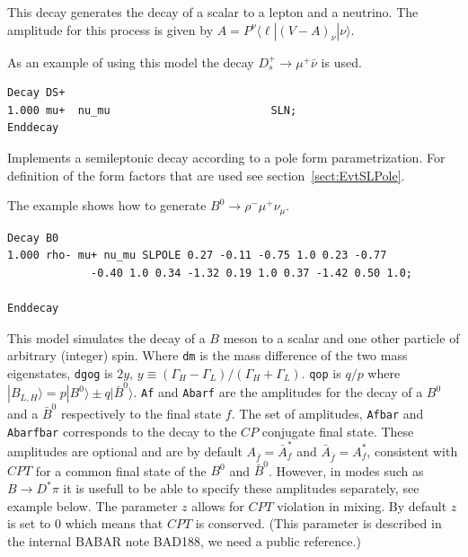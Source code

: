 
\label{sln}



\Expl
This decay generates the decay of a scalar to a lepton and a 
neutrino. The amplitude for this process is given by
$A=P^{\nu}\langle \ell | (V-A)_{\nu} | \nu \rangle$.

\Example 
As an example of using this model the decay $D_s^+\rightarrow \mu^+\bar\nu$
is used.
\begin{verbatim}
Decay DS+
1.000 mu+  nu_mu                         SLN;
Enddecay
\end{verbatim}




\label{SLPOLE}



\Expl
Implements a semileptonic decay according to a pole form parametrization.
For definition of the form factors that are used see 
section~\ref{sect:EvtSLPole}.
 
\Example
The example shows how to generate $B^0\rightarrow \rho^- \mu^+ \nu_{\mu}$.
\begin{verbatim}
Decay B0
1.000 rho- mu+ nu_mu SLPOLE 0.27 -0.11 -0.75 1.0 0.23 -0.77 
             -0.40 1.0 0.34 -1.32 0.19 1.0 0.37 -1.42 0.50 1.0;

Enddecay
\end{verbatim}







\label{ssdcp}



\Expl
This model simulates the decay of a $B$ meson to a scalar and
one other particle of arbitrary (integer) spin.
Where {\tt dm} is the mass difference of the two mass eigenstates, {\tt dgog} 
is $2y$, $y\equiv (\Gamma_H-\Gamma_L)/(\Gamma_H+\Gamma_L)$. {\tt qop} is
$q/p$ where $|B_{L,H}\rangle=p|B^0\rangle\pm q|\bar B^0\rangle$.
{\tt Af} and {\tt Abarf} are the amplitudes for the decay of a $B^0$ and a 
$\bar B^0$ respectively to the final state $f$. The set of amplitudes,
{\tt Afbar} and {\tt Abarfbar} corresponds to the decay to the 
$CP$ conjugate final state. These amplitudes are optional and are by
default $A_{\bar f}=\bar A^*_{f}$ and ${\bar A}_{\bar f}=A^*_f$,
consistent with $CPT$ for a common final state of the $B^0$ and $\bar B^0$.
However, in modes such as $B\to D^*\pi$ it is usefull to be able to 
specify these amplitudes separately, see example below. The parameter
$z$ allows for $CPT$ violation in mixing. By default $z$ is set to 0
which means that $CPT$ is conserved. (This parameter is described in
the internal BABAR note BAD188, we need a public reference.)


